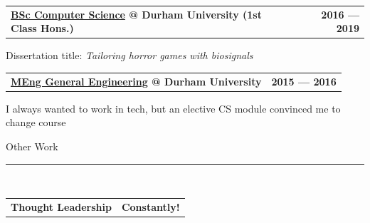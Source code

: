 \documentclass[hidelinks, 12pt, a4paper]{article}
\begin{document}
	
	\begin{tabularx}{\linewidth}{X r}
		\textbf{\href{https://www.dur.ac.uk/courses/info/?id=11509\&title=Computer+Science\&code=G400\&type=BSC\&year=2016}{BSc Computer Science} @ Durham University (1st Class Hons.)} & \textbf{2016 --- 2019}
	\end{tabularx}\vspace{2pt}

	\hspace{0.05\linewidth}\begin{minipage}{0.95\linewidth}
		Dissertation title: \emph{Tailoring horror games with biosignals}\\
	\end{minipage}

	
	\begin{tabularx}{\linewidth}{X r}
		\textbf{\href{https://www.dur.ac.uk/courses/info/?id=11558\&title=General+Engineering\&code=H100\&type=MENG\&year=2015}{MEng General Engineering} @ Durham University} & \textbf{2015 --- 2016}
	\end{tabularx}\vspace{2pt}

	\hspace{0.05\linewidth}\begin{minipage}{0.95\linewidth}
		I always wanted to work in tech, but an elective CS module convinced me to change course\\
	\end{minipage}

	
	\vspace{8pt}
	\begin{Large}Other Work\end{Large}
	\rule{200pt}{1pt}\\
	
	
	\begin{tabularx}{\linewidth}{X r}
		\textbf{Thought Leadership} & \textbf{Constantly!}
	\end{tabularx}\vspace{2pt}
	
\end{document}
